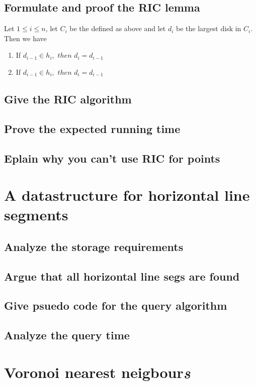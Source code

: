 \documentclass{article}
\begin{document}
\subsection{Formulate and proof the RIC lemma}
Let $1 \leq i \leq n$, let $C_i$ be the defined as above and let $d_i$ be
the largest disk in $C_i$. Then we have
\begin{enumerate}[i]
	\item If $d_{i-1} \in h_{i},$ $then$ $d_i = d_{i-1}$
	\item If $d_{i-1} \in h_{i},$ $then$ $d_i = d_{i-1}$
\end{enumerate}

\subsection{Give the RIC algorithm}

\subsection{Prove the expected running time}
\subsection{Eplain why you can't use RIC for points}
\section{A datastructure for horizontal line segments}

\subsection{Analyze the storage requirements}
\subsection{Argue that all horizontal line segs are found}
\subsection{Give psuedo code for the query algorithm}

\subsection{Analyze the query time}

\section{Voronoi nearest neigbour\emph{s}}
\end{document}
